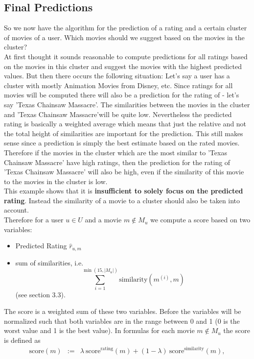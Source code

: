 \documentclass{article}
\begin{document}
\subsection{Final Predictions}

So we now have the algorithm for the prediction of a rating and a certain cluster of movies of a user. Which movies should we suggest based on the movies in the cluster?\\
At first thought it sounds reasonable to compute predictions for all ratings based on the movies in this cluster and suggest the movies with the highest predicted values. But then there occurs the following situation: Let's say a user has a cluster with mostly Animation Movies from Disney, etc. Since ratings for all movies will be computed there will also be a prediction for the rating of - let's say 'Texas Chainsaw Massacre'. The similarities between the movies in the cluster and 'Texas Chainsaw Massacre'will be quite low. Nevertheless the predicted rating is basically a weighted average which means that just the relative and not the total height of similarities are important for the prediction. This still makes sense since a prediction is simply the best estimate based on the rated movies. Therefore if the movies in the cluster which are the most similar to 'Texas Chainsaw Massacre' have high ratings, then the prediction for the rating of 'Texas Chainsaw Massacre' will also be high, even if the similarity of this movie to the movies in the cluster is low.\\
This example shows that it is \textbf{insufficient to solely focus on the predicted rating}. Instead the similarity of a movie to a cluster should also be taken into account.\\
Therefore for a user $u\in U$ and a movie $m\notin M_u$ we compute a score based on two variables:
\begin{itemize}
\item Predicted Rating $\hat{r}_{u,m}$
\item sum of similarities, i.e.
\[ \sum_{i=1}^{\min(15, |M_u|)} \text{similarity}(m^{(i)}, m)\]
(see section 3.3).
\end{itemize}
The score is a weighted sum of these two variables. Before the variables will be normalized such that both variables are in the range between 0 and 1 (0 is the worst value and 1 is the best value). In formulas for each movie $m\notin M_u$ the score is defined as
\begin{eqnarray}
\text{score}(m) & := & \lambda ~ \text{score}^{\text{rating}}(m) + (1-\lambda)~ \text{score}^{\text{similarity}}(m),\nonumber
\end{eqnarray}
\end{document}
